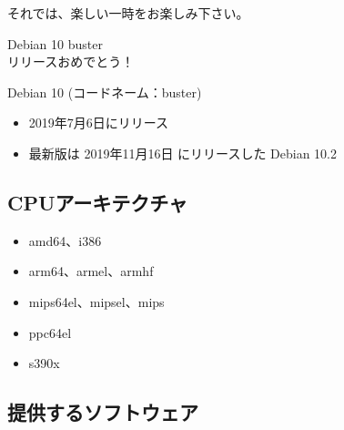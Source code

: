 \documentclass[mingoth,a4paper]{jsarticle}
\begin{document}
 それでは、楽しい一時をお楽しみ下さい。
 


  \begin{center}\Huge{Debian 10 buster\\リリースおめでとう！}\end{center}

Debian 10 (コードネーム：buster)

\begin{itemize}
\item 2019年7月6日にリリース
\item 最新版は 2019年11月16日 にリリースした Debian 10.2
\end{itemize}





\subsection{CPUアーキテクチャ}

\begin{itemize}
\item amd64、i386
\item arm64、armel、armhf
\item mips64el、mipsel、mips
\item ppc64el
\item s390x
\end{itemize}
    

\clearpage

\subsection{提供するソフトウェア}
\end{document}
